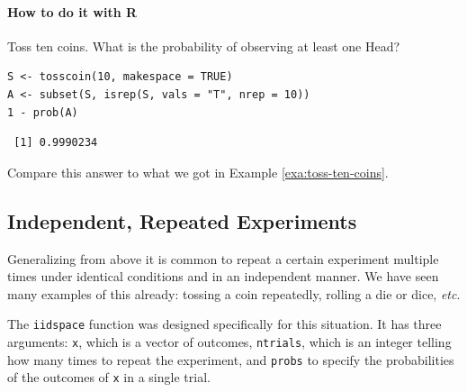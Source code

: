 \documentclass[captions=tableheading]{scrbook}
\begin{document}
\paragraph*{How to do it with \textsf{R}}

\begin{example}
Toss ten coins. What is the probability of observing at least one Head?


\begin{verbatim}
S <- tosscoin(10, makespace = TRUE)
A <- subset(S, isrep(S, vals = "T", nrep = 10))
1 - prob(A)
\end{verbatim}

\begin{verbatim}
 [1] 0.9990234
\end{verbatim}

Compare this answer to what we got in Example \ref{exa:toss-ten-coins}.

\end{example}
\subsection{Independent, Repeated Experiments}
\label{sec-4-7-1}


Generalizing from above it is common to repeat a certain experiment multiple times under identical conditions and in an independent manner. We have seen many examples of this already: tossing a coin repeatedly, rolling a die or dice, \emph{etc}.

The \texttt{iidspace} function was designed specifically for this situation. It has three arguments: \texttt{x}, which is a vector of outcomes, \texttt{ntrials}, which is an integer telling how many times to repeat the experiment, and \texttt{probs} to specify the probabilities of the outcomes of \texttt{x} in a single trial. 
\end{document}
